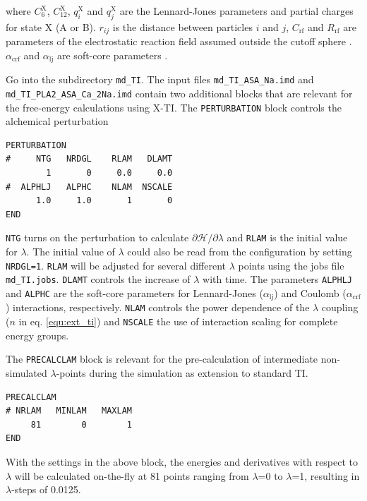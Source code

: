 \noindent where $C_{6}^{\text{X}}$, $C_{12}^{\text{X}}$, $q_i^{\text{X}}$ and $q_j^{\text{X}}$ are the Lennard-Jones parameters and partial charges for state X (A or B). $r_{ij}$ is the distance between particles $i$ and $j$, $C_{\text{rf}}$ and $R_{\text{rf}}$ are parameters of the electrostatic reaction field assumed outside the cutoff sphere \cite{Tironi1995}. 
$\alpha_{\text{crf}}$ and $\alpha_{\text{lj}}$ are soft-core parameters \cite{Beutler1994}. 

Go into the subdirectory \texttt{md\_TI}. The input files \texttt{md\_TI\_ASA\_Na.imd} and \texttt{md\_TI\_PLA2\_ASA\_Ca\_2Na.imd} contain two additional blocks that are relevant for the free-energy calculations using X-TI. The \texttt{PERTURBATION} block controls the alchemical perturbation 
\begin{lstlisting}
PERTURBATION
#     NTG   NRDGL    RLAM   DLAMT 
        1       0     0.0     0.0 
#  ALPHLJ   ALPHC    NLAM  NSCALE 
      1.0     1.0       1       0 
END
\end{lstlisting}
\texttt{NTG} turns on the perturbation to calculate $\partial\mathcal{H}/\partial\lambda$ and \texttt{RLAM} is the initial value for $\lambda$. The initial value of $\lambda$ could also be read from the configuration by setting \texttt{NRDGL=1}. \texttt{RLAM} will be adjusted for several different $\lambda$ points using the jobs file \texttt{md\_TI.jobs}. \texttt{DLAMT} controls the increase of $\lambda$ with time. The parameters \texttt{ALPHLJ} and \texttt{ALPHC} are the soft-core parameters for Lennard-Jones ($\alpha_{\text{lj}}$) and Coulomb ($\alpha_{\text{crf}}$) interactions, respectively. \texttt{NLAM} controls the power dependence of the $\lambda$ coupling ($n$ in eq. \ref{equ:ext_ti}) and \texttt{NSCALE} the use of interaction scaling for complete energy groups.  

The \texttt{PRECALCLAM} block is relevant for the pre-calculation of intermediate non-simulated $\lambda$-points during the simulation as extension to standard TI. 
\begin{lstlisting}
PRECALCLAM
# NRLAM   MINLAM   MAXLAM
     81        0        1
END
\end{lstlisting}
With the settings in the above block, the energies and derivatives with respect to $\lambda$ will be calculated on-the-fly at 81 points ranging from $\lambda$=0 to $\lambda$=1, resulting in $\lambda$-steps of 0.0125.


